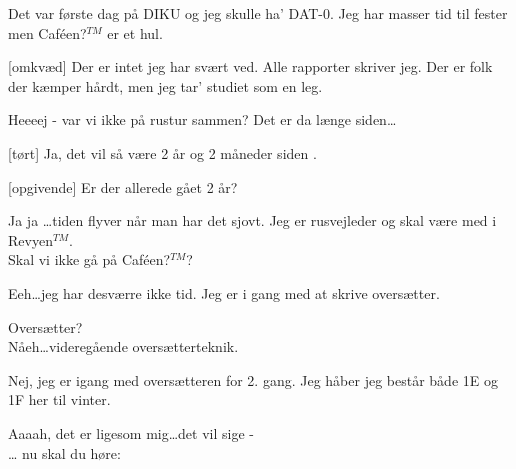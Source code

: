 \documentclass[a4paper]{article}
\begin{document}



\begin{song}
  Det var første dag på DIKU
  og jeg skulle ha' DAT-0.
  Jeg har masser tid til fester
  men Caf\'een?$^{TM}$ er et hul.

  [omkvæd]
  Der er intet jeg har svært ved.
  Alle rapporter skriver jeg.
  Der er folk der kæmper hårdt, men 
  jeg tar' studiet som en leg.
\end{song}



\begin{sketch}
   Heeeej - var vi ikke på rustur sammen? Det er da længe
  siden\ldots

  [tørt] Ja, det vil så være 2 år og 2 måneder siden
  .

  [opgivende]  Er der allerede gået 2 år?

   Ja ja \dots tiden flyver når man har det sjovt. Jeg er
  rusvejleder og skal være med i Revyen$^{TM}$.\\
  Skal vi ikke gå på Caf\'een?$^{TM}$?
  
   Eeh\dots jeg har desværre ikke tid. Jeg er i gang med at
  skrive oversætter.

   Oversætter? \\
  Nåeh\dots videregående oversætterteknik.

   Nej, jeg er igang med oversætteren for 2. gang. Jeg håber
  jeg består både 1E og 1F her til vinter.

    Aaaah, det er ligesom mig\ldots det
  vil sige - \\
  \ldots{} nu skal du høre:
\end{sketch}
\end{document}
